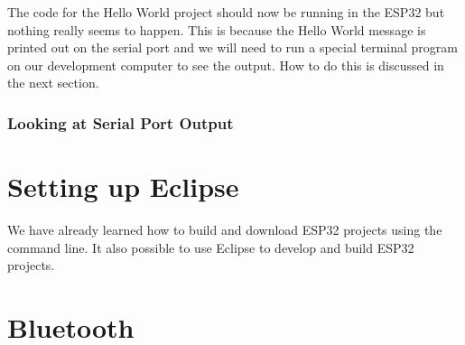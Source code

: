 \documentclass{tufte-book}
\begin{document}
The code for the Hello World project should now be running in the ESP32 but nothing really seems to happen. This is because the Hello World message is printed out on the serial port and we will need to run a special terminal program on our development computer to see the output. How to do this is discussed in the next section.

\subsection{Looking at Serial Port Output}

\chapter{Setting up Eclipse}


We have already learned how to build and download ESP32 projects using the command line. It also possible to use Eclipse to develop and build ESP32 projects.

\chapter{Bluetooth}
\end{document}
